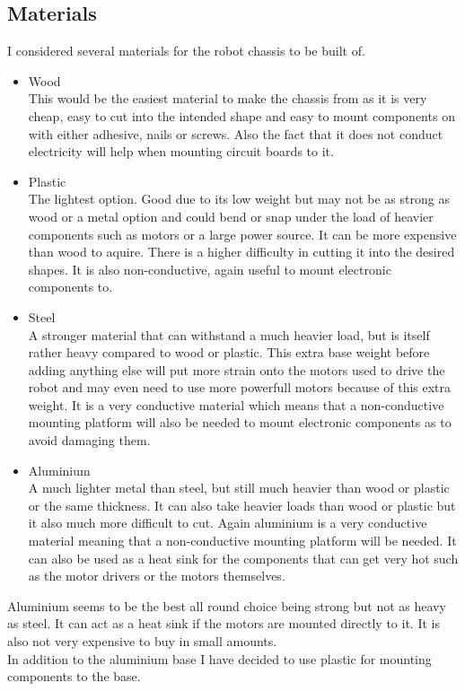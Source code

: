\subsection{Materials}
I considered several materials for the robot chassis to be built of.
\begin{itemize}
\item Wood
\\This would be the easiest material to make the chassis from as it is very cheap, easy to cut into the intended shape and easy to mount components on with either adhesive, nails or screws.  Also the fact that it does not conduct electricity will help when mounting circuit boards to it.

\item Plastic
\\The lightest option.  Good due to its low weight but may not be as strong as wood or a metal option and could bend or snap under the load of heavier components such as motors or a large power source.  It can be more expensive than wood to aquire.  There is a higher difficulty in cutting it into the desired shapes.  It is also non-conductive, again useful to mount electronic components to.

\item Steel
\\A stronger material that can withstand a much heavier load, but is itself rather heavy compared to wood or plastic.  This extra base weight before adding anything else will put more strain onto the motors used to drive the robot and may even need to use more powerfull motors because of this extra weight.  It is a very conductive material which means that a non-conductive mounting platform will also be needed to mount electronic components as to avoid damaging them.

\item Aluminium
\\A much lighter metal than steel, but still much heavier than wood or plastic or the same thickness.  It can also take heavier loads than wood or plastic but it also much more difficult to cut.  Again aluminium is a very conductive material meaning that a non-conductive mounting platform will be needed.  It can also be used as a heat sink for the components that can get very hot such as the motor drivers or the motors themselves.

\end{itemize}

Aluminium seems to be the best all round choice being strong but not as heavy as steel.  It can act as a heat sink if the motors are mounted directly to it.  It is also not very expensive to buy in small amounts.
\\In addition to the aluminium base I have decided to use plastic for mounting components to the base.


